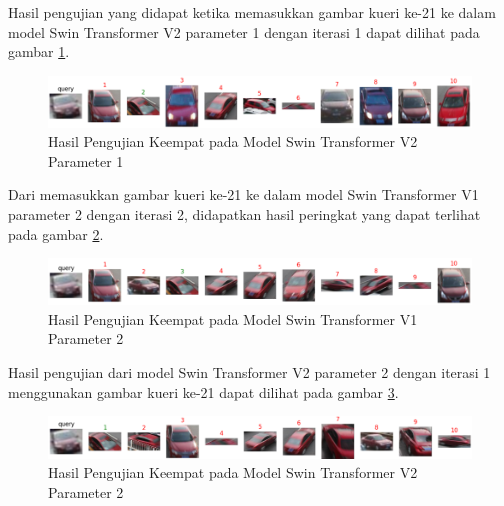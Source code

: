 Hasil pengujian yang didapat ketika memasukkan gambar kueri ke-21 ke dalam model Swin Transformer V2 parameter 1 dengan 
iterasi 1 dapat dilihat pada gambar \ref{fig:hasilpengujiankeempatpadamodelswintransformerv2param1}.

\begin{figure}[h!]
  \centering
  \includegraphics[scale=0.6]{gambar/Que21V2P1IT1.png}
  \caption{Hasil Pengujian Keempat pada Model Swin Transformer V2 Parameter 1}
  \label{fig:hasilpengujiankeempatpadamodelswintransformerv2param1}
\end{figure}

Dari memasukkan gambar kueri ke-21 ke dalam model Swin Transformer V1 parameter 2 dengan iterasi 2, didapatkan hasil 
peringkat yang dapat terlihat pada gambar \ref{fig:hasilpengujiankeempatpadamodelswintransformerv1param2}.

\begin{figure}[h!]
  \centering
  \includegraphics[scale=0.6]{gambar/Que21V1P2IT2.png}
  \caption{Hasil Pengujian Keempat pada Model Swin Transformer V1 Parameter 2}
  \label{fig:hasilpengujiankeempatpadamodelswintransformerv1param2}
\end{figure}

Hasil pengujian dari model Swin Transformer V2 parameter 2 dengan iterasi 1 menggunakan gambar kueri ke-21 dapat 
dilihat pada gambar \ref{fig:hasilpengujiankeempatpadamodelswintransformerv2param2}.

\begin{figure}[h!]
  \centering
  \includegraphics[scale=0.6]{gambar/Que21V2P2IT1.png}
  \caption{Hasil Pengujian Keempat pada Model Swin Transformer V2 Parameter 2}
  \label{fig:hasilpengujiankeempatpadamodelswintransformerv2param2}
\end{figure}

